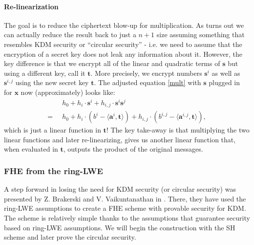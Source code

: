 \paragraph{Re-linearization}
The goal is to reduce the ciphertext blow-up for multiplication. As turns out we can actually reduce the result back to just a $n+1$ size assuming something that resembles KDM security or ``circular security'' - i.e. we need to assume that the encryption of a secret key does not leak any information about it. However, the key difference is that we encrypt all of the linear and quadratic terms of $\bm{s}$ but using a different key, call it $\bm{t}$. More precisely, we encrypt numbers $\bm{s}^i$ as well as $\bm{s}^{i,j}$ using the new secret key $\bm{t}$. The adjusted equation \ref{mult} with $\bm{s}$ plugged in for $\bm{x}$ now (approximately) looks like: 
\begin{align*}
  & h_0 + h_i \cdot \bm{s}^i + h_{i,j} \cdot \bm{s}^i \bm{s}^j\\
  = \; \; & h_0 + h_i \cdot (b^i - \langle \bm{a}^i, \bm{t} \rangle) + h_{i,j} \cdot (b^{i,j} - \langle \bm{a}^{i,j}, \bm{t} \rangle), 
\end{align*}
which is just a linear function in $\bm{t}$! The key take-away is that multiplying the two linear functions and later re-linearizing, gives us another linear function that, when evaluated in $\bm{t}$, outputs the product of the original messages.

\subsubsection{FHE from the ring-LWE}
A step forward in losing the need for KDM security (or circular security) was presented by Z. Brakerski and V. Vaikuntanathan in \cite{fhe_rlwe}. There, they have used the ring-LWE assumptions to create a FHE scheme with provable security for KDM. The scheme is relatively simple thanks to the assumptions that guarantee security based on ring-LWE assumptions. We will begin the construction with the SH scheme and later prove the circular security.

